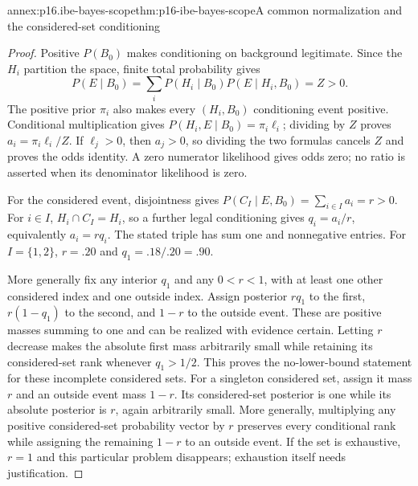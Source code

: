 \begin{annexitem}{annex:p16.ibe-bayes-scope}{thm:p16-ibe-bayes-scope}{A common normalization and the considered-set conditioning}
\begin{proof}
Positive \(P(B_0)\) makes conditioning on background legitimate.
Since the \(H_i\) partition the space, finite total probability gives
\[
 P(E\mid B_0)=\sum_iP(H_i\mid B_0)P(E\mid H_i,B_0)=Z>0.
\]
The positive prior \(\pi_i\) also makes every \((H_i,B_0)\)
conditioning event positive. Conditional multiplication gives
\(P(H_i,E\mid B_0)=\pi_i\ell_i\); dividing by \(Z\)
proves \(a_i=\pi_i\ell_i/Z\). If \(\ell_j>0\), then
\(a_j>0\), so dividing the two formulas cancels \(Z\) and
proves the odds identity. A zero numerator likelihood gives odds zero;
no ratio is asserted when its denominator likelihood is zero.

For the considered event, disjointness gives
\(P(C_I\mid E,B_0)=\sum_{i\in I}a_i=r>0\). For \(i\in I\),
\(H_i\cap C_I=H_i\), so a further legal conditioning gives
\(q_i=a_i/r\), equivalently \(a_i=rq_i\). The stated triple
has sum one and nonnegative entries. For \(I=\{1,2\}\),
\(r=.20\) and \(q_1=.18/.20=.90\).

More generally fix any interior \(q_1\) and any \(0<r<1\), with
at least one other considered index and one outside index. Assign posterior
\(rq_1\) to the first, \(r(1-q_1)\) to the second, and \(1-r\)
to the outside event. These are positive masses summing to one and can
be realized with evidence certain. Letting \(r\) decrease makes the
absolute first mass arbitrarily small while retaining its considered-set
rank whenever \(q_1>1/2\). This proves the no-lower-bound statement
for these incomplete considered sets. For a singleton considered set,
assign it mass \(r\) and an outside event mass \(1-r\). Its
considered-set posterior is one while its absolute posterior is \(r\),
again arbitrarily small. More generally, multiplying any positive
considered-set probability vector by \(r\) preserves every conditional
rank while assigning the remaining \(1-r\) to an outside event.
If the set is exhaustive, \(r=1\)
and this particular problem disappears; exhaustion itself needs justification.
\end{proof}
\end{annexitem}

